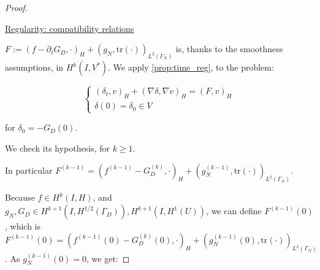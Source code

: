 \documentclass[english,a4paper,9pt,oneside]{scrbook}	%
\theoremstyle{break}
\newenvironment{mproof}[1][\proofname]{%
  \begin{proof}[#1]$ $\par\nobreak\ignorespaces
}{%
  \end{proof}
}
\renewcommand*{\proofname}{Proof}
\theoremstyle{remark}
\newcommand{\norm}[1]{\left\lVert#1\right\rVert}
\newcommand{\tr}{\text{tr}}
\begin{document}
\begin{appendices}
\begin{mproof}
\underline{Regularity: compatibility relations}
%
%
%
%
%
%
%
%
%

$F:=(f-\partial_t G_D, \cdot)_H + (g_N, \tr(\cdot))_{L^2(\Gamma_N)}$ is, thanks to the smoothness assumptions, in $H^k(I,V^*)$. We apply \cref{prop:time_reg}, to the problem:

$$
\left\{\begin{matrix}
(\delta_t,v)_H + (\nabla \delta, \nabla v)_H = (F, v)_H \\
\delta(0) = \delta_0 \in V
\end{matrix}\right.
$$

for $\delta_0 = - G_D(0)$.

We check its hypothesis, for $k\geq 1$.

In particular $F^{(k-1)} = (f^{(k-1)} - G^{(k)}_D, \cdot)_H +(g_N^{(k-1)}, \tr(\cdot))_{L^2(\Gamma_N)}$.

Because $f\in H^k(I,H)$, and $g_N, G_D \in  H^{k+1}(I,H^{1/2}(\Gamma_D)), H^{k+1}(I,H^1(U))$, we can define $F^{(k-1)}(0)$, which is $F^{(k-1)}(0) = (f^{(k-1)}(0) - G^{(k)}_D (0), \cdot)_H +(g_N^{(k-1)}(0), \tr(\cdot))_{L^2(\Gamma_N)}$. As $g_N^{(k-1)}(0) = 0$, we get:


\end{mproof}
\end{appendices}
\end{document}
